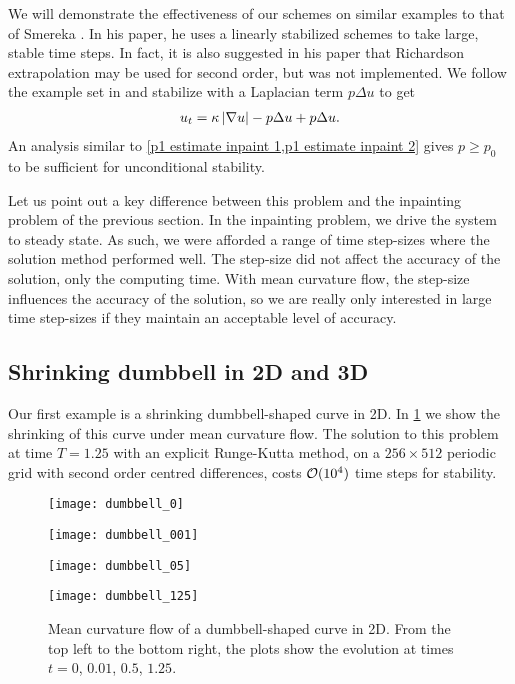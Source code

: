 We will demonstrate the effectiveness of our schemes on similar examples to that of Smereka \cite{smereka2003semi}. In his paper, he uses a linearly stabilized schemes to take large, stable time steps. In fact, it is also suggested in his paper that Richardson extrapolation may be used for second order, but was not implemented. We follow the example set in \cite{smereka2003semi} and stabilize with a Laplacian term $p\Delta u$ to get 
\begin{align}
        u_t = \kappa \left|\nabla u\right| - p\Delta u + p\Delta u.
\end{align}
An analysis similar to \cref{p1 estimate inpaint 1,p1 estimate inpaint 2} gives $p\geq p_0$ to be sufficient for unconditional stability.

Let us point out a key difference between this problem and the inpainting problem of the previous section. In the inpainting problem, we drive the system to steady state.  As such, we were afforded a range of time step-sizes where the solution method performed well. The step-size did not affect the accuracy of the solution, only the computing time. With mean curvature flow, the step-size influences the accuracy of the solution, so we are really only interested in large time step-sizes if they maintain an acceptable level of accuracy.

\subsection{Shrinking dumbbell in 2D and 3D}
Our first example is a shrinking dumbbell-shaped curve in 2D. In \cref{fig:mcm 2d dumbbell} we show the shrinking of this curve under mean curvature flow. The solution to this problem at time $T=1.25$ with an explicit Runge-Kutta method, on a $256\times 512$ periodic grid with second order centred differences, costs $\mathcal{O}(10^4)$ time steps for stability.

\begin{figure}[htb!]
        \centering
\begin{minipage}{0.48\textwidth}
        \texttt{[image: dumbbell\_0]}
\end{minipage}%
\begin{minipage}{0.48\textwidth}
        \texttt{[image: dumbbell\_001]}
\end{minipage}
\begin{minipage}{0.48\textwidth}
        \texttt{[image: dumbbell\_05]}
\end{minipage}%
\begin{minipage}{0.48\textwidth}
        \texttt{[image: dumbbell\_125]}
\end{minipage}%
\caption[Mean curvature flow of a dumbbell-shaped curve in 2D.]{Mean curvature flow of a dumbbell-shaped curve in 2D. From the top left to the bottom right, the plots show the evolution at times $t=0$, $0.01$, $0.5$, $1.25$.}
\label{fig:mcm 2d dumbbell}
\end{figure}

